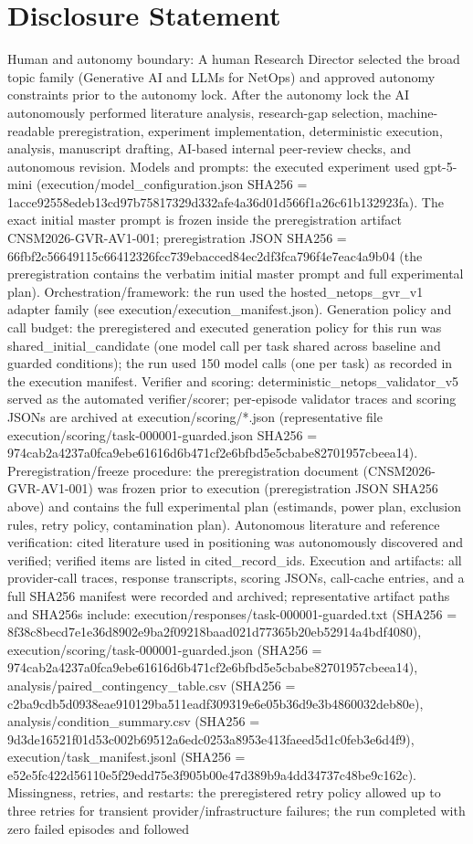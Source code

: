 \documentclass[conference]{IEEEtran}
\begin{document}
\section*{Disclosure Statement}
Human and autonomy boundary: A human Research Director selected the broad topic family (Generative AI and LLMs for NetOps) and approved autonomy constraints prior to the autonomy lock. After the autonomy lock the AI autonomously performed literature analysis, research-gap selection, machine-readable preregistration, experiment implementation, deterministic execution, analysis, manuscript drafting, AI-based internal peer-review checks, and autonomous revision. Models and prompts: the executed experiment used gpt-5-mini (execution/model\_configuration.json SHA256 = 1acce92558edeb13cd97b75817329d332afe4a36d01d566f1a26c61b132923fa). The exact initial master prompt is frozen inside the preregistration artifact CNSM2026-GVR-AV1-001; preregistration JSON SHA256 = 66fbf2c56649115c66412326fcc739ebacced84ec2df3fca796f4e7eac4a9b04 (the preregistration contains the verbatim initial master prompt and full experimental plan). Orchestration/framework: the run used the hosted\_netops\_gvr\_v1 adapter family (see execution/execution\_manifest.json). Generation policy and call budget: the preregistered and executed generation policy for this run was shared\_initial\_candidate (one model call per task shared across baseline and guarded conditions); the run used 150 model calls (one per task) as recorded in the execution manifest. Verifier and scoring: deterministic\_netops\_validator\_v5 served as the automated verifier/scorer; per-episode validator traces and scoring JSONs are archived at execution/scoring/*.json (representative file execution/scoring/task-000001-guarded.json SHA256 = 974cab2a4237a0fca9ebe61616d6b471cf2e6bfbd5e5cbabe82701957cbeea14). Preregistration/freeze procedure: the preregistration document (CNSM2026-GVR-AV1-001) was frozen prior to execution (preregistration JSON SHA256 above) and contains the full experimental plan (estimands, power plan, exclusion rules, retry policy, contamination plan). Autonomous literature and reference verification: cited literature used in positioning was autonomously discovered and verified; verified items are listed in cited\_record\_ids. Execution and artifacts: all provider-call traces, response transcripts, scoring JSONs, call-cache entries, and a full SHA256 manifest were recorded and archived; representative artifact paths and SHA256s include: execution/responses/task-000001-guarded.txt (SHA256 = 8f38c8becd7e1e36d8902e9ba2f09218baad021d77365b20eb52914a4bdf4080), execution/scoring/task-000001-guarded.json (SHA256 = 974cab2a4237a0fca9ebe61616d6b471cf2e6bfbd5e5cbabe82701957cbeea14), analysis/paired\_contingency\_table.csv (SHA256 = c2ba9cdb5d0938eae910129ba511eadf309319e6e05b36d9e3b4860032deb80e), analysis/condition\_summary.csv (SHA256 = 9d3de16521f01d53c002b69512a6edc0253a8953e413faeed5d1c0feb3e6d4f9), execution/task\_manifest.jsonl (SHA256 = e52e5fc422d56110e5f29edd75e3f905b00e47d389b9a4dd34737c48be9c162c). Missingness, retries, and restarts: the preregistered retry policy allowed up to three retries for transient provider/infrastructure failures; the run completed with zero failed episodes and followed 
\end{document}
